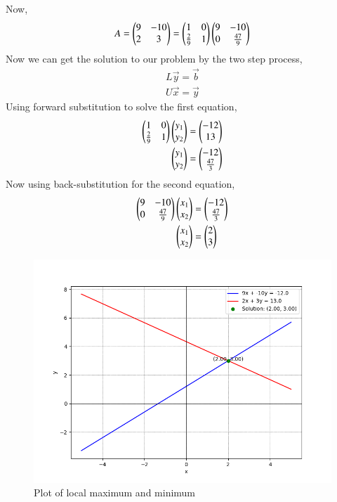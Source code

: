 \documentclass[journal]{IEEEtran}
\begin{document}
Now,
\begin{align}
    A = \begin{pmatrix}9 & -10 \\ 2 & 3\end{pmatrix} = \begin{pmatrix}1 & 0 \\ \frac{2}{9} & 1\end{pmatrix}\begin{pmatrix}9 & -10 \\ 0 & \frac{47}{9}\end{pmatrix}
\end{align}
Now we can get the solution to our problem by the two step process,
\begin{align}
    L\vec{y} = \vec{b}\\
    U\vec{x} = \vec{y}
\end{align}
Using forward substitution to solve the first equation,
\begin{align}
    \begin{pmatrix}1 & 0 \\ \frac{2}{9} & 1\end{pmatrix}\begin{pmatrix}y_1 \\ y_2\end{pmatrix} &= \begin{pmatrix}-12 \\ 13\end{pmatrix}\\
    \begin{pmatrix}y_1 \\ y_2\end{pmatrix} &= \begin{pmatrix}-12 \\ \frac{47}{3}\end{pmatrix} 
\end{align}
Now using back-substitution for the second equation,
\begin{align}
    \begin{pmatrix}9 & -10 \\ 0 & \frac{47}{9}\end{pmatrix}\begin{pmatrix}x_1 \\ x_2\end{pmatrix} &= \begin{pmatrix}-12 \\ \frac{47}{3}\end{pmatrix}\\
    \begin{pmatrix}x_1 \\ x_2\end{pmatrix} &= \begin{pmatrix}2 \\ 3\end{pmatrix}
\end{align}

\begin{figure}[ht]
    \centering
    \includegraphics[width=\columnwidth]{figs/plot.png}
    \caption{Plot of local maximum and minimum}
    \label{fig:Plot1}
    \end{figure}
\end{document}
